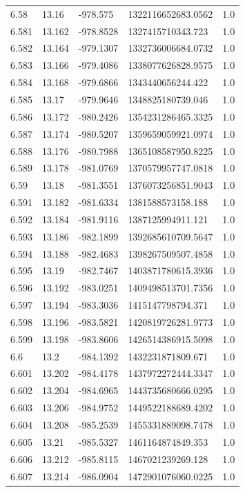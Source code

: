 \begin{tabular}{lllll}
6.58 & 13.16 & -978.575 & 1322116652683.0562 & 1.0 \\
6.581 & 13.162 & -978.8528 & 1327415710343.723 & 1.0 \\
6.582 & 13.164 & -979.1307 & 1332736006684.0732 & 1.0 \\
6.583 & 13.166 & -979.4086 & 1338077626828.9575 & 1.0 \\
6.584 & 13.168 & -979.6866 & 1343440656244.422 & 1.0 \\
6.585 & 13.17 & -979.9646 & 1348825180739.046 & 1.0 \\
6.586 & 13.172 & -980.2426 & 1354231286465.3325 & 1.0 \\
6.587 & 13.174 & -980.5207 & 1359659059921.0974 & 1.0 \\
6.588 & 13.176 & -980.7988 & 1365108587950.8225 & 1.0 \\
6.589 & 13.178 & -981.0769 & 1370579957747.0818 & 1.0 \\
6.59 & 13.18 & -981.3551 & 1376073256851.9043 & 1.0 \\
6.591 & 13.182 & -981.6334 & 1381588573158.188 & 1.0 \\
6.592 & 13.184 & -981.9116 & 1387125994911.121 & 1.0 \\
6.593 & 13.186 & -982.1899 & 1392685610709.5647 & 1.0 \\
6.594 & 13.188 & -982.4683 & 1398267509507.4858 & 1.0 \\
6.595 & 13.19 & -982.7467 & 1403871780615.3936 & 1.0 \\
6.596 & 13.192 & -983.0251 & 1409498513701.7356 & 1.0 \\
6.597 & 13.194 & -983.3036 & 1415147798794.371 & 1.0 \\
6.598 & 13.196 & -983.5821 & 1420819726281.9773 & 1.0 \\
6.599 & 13.198 & -983.8606 & 1426514386915.5098 & 1.0 \\
6.6 & 13.2 & -984.1392 & 1432231871809.671 & 1.0 \\
6.601 & 13.202 & -984.4178 & 1437972272444.3347 & 1.0 \\
6.602 & 13.204 & -984.6965 & 1443735680666.0295 & 1.0 \\
6.603 & 13.206 & -984.9752 & 1449522188689.4202 & 1.0 \\
6.604 & 13.208 & -985.2539 & 1455331889098.7478 & 1.0 \\
6.605 & 13.21 & -985.5327 & 1461164874849.353 & 1.0 \\
6.606 & 13.212 & -985.8115 & 1467021239269.128 & 1.0 \\
6.607 & 13.214 & -986.0904 & 1472901076060.0225 & 1.0 \\

\end{tabular}
